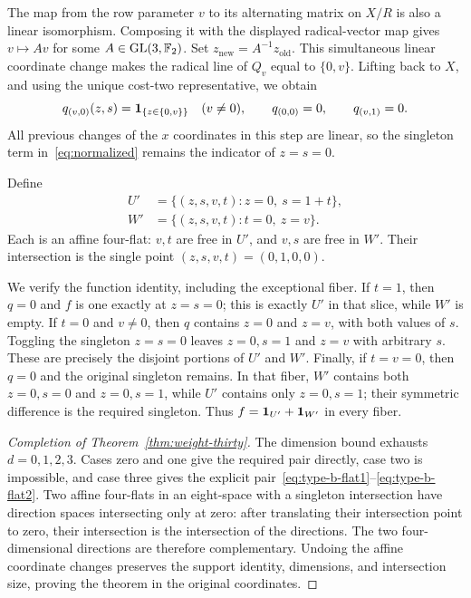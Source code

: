 The map from the row parameter $v$ to its alternating matrix on $X/R$ is also a linear isomorphism. Composing it with the displayed radical-vector map gives $v\mapsto Av$ for some $A\in\operatorname{GL}(3,\mathbb F_2)$. Set $z_{\mathrm{new}}=A^{-1}z_{\mathrm{old}}$. This simultaneous linear coordinate change makes the radical line of $Q_v$ equal to $\{0,v\}$. Lifting back to $X$, and using the unique cost-two representative, we obtain
\begin{equation}\label{eq:type-b-rows}
q_{(v,0)}(z,s)=\mathbf 1_{\{z\in\{0,v\}\}}\quad(v\ne0),
\qquad q_{(0,0)}=0,\qquad q_{(v,1)}=0.
\end{equation}
All previous changes of the $x$ coordinates in this step are linear, so the singleton term in~\eqref{eq:normalized} remains the indicator of $z=s=0$.

Define
\begin{align}
U'&=\{(z,s,v,t):z=0,\ s=1+t\},\label{eq:type-b-flat1}\\
W'&=\{(z,s,v,t):t=0,\ z=v\}.\label{eq:type-b-flat2}
\end{align}
Each is an affine four-flat: $v,t$ are free in $U'$, and $v,s$ are free in $W'$. Their intersection is the single point $(z,s,v,t)=(0,1,0,0)$.

We verify the function identity, including the exceptional fiber. If $t=1$, then $q=0$ and $f$ is one exactly at $z=s=0$; this is exactly $U'$ in that slice, while $W'$ is empty. If $t=0$ and $v\ne0$, then $q$ contains $z=0$ and $z=v$, with both values of $s$. Toggling the singleton $z=s=0$ leaves $z=0,s=1$ and $z=v$ with arbitrary $s$. These are precisely the disjoint portions of $U'$ and $W'$. Finally, if $t=v=0$, then $q=0$ and the original singleton remains. In that fiber, $W'$ contains both $z=0,s=0$ and $z=0,s=1$, while $U'$ contains only $z=0,s=1$; their symmetric difference is the required singleton. Thus $f=\mathbf 1_{U'}+\mathbf 1_{W'}$ in every fiber.

\begin{proof}[Completion of Theorem~\ref{thm:weight-thirty}]
The dimension bound exhausts $d=0,1,2,3$. Cases zero and one give the required pair directly, case two is impossible, and case three gives the explicit pair~\eqref{eq:type-b-flat1}--\eqref{eq:type-b-flat2}. Two affine four-flats in an eight-space with a singleton intersection have direction spaces intersecting only at zero: after translating their intersection point to zero, their intersection is the intersection of the directions. The two four-dimensional directions are therefore complementary. Undoing the affine coordinate changes preserves the support identity, dimensions, and intersection size, proving the theorem in the original coordinates.
\end{proof}

